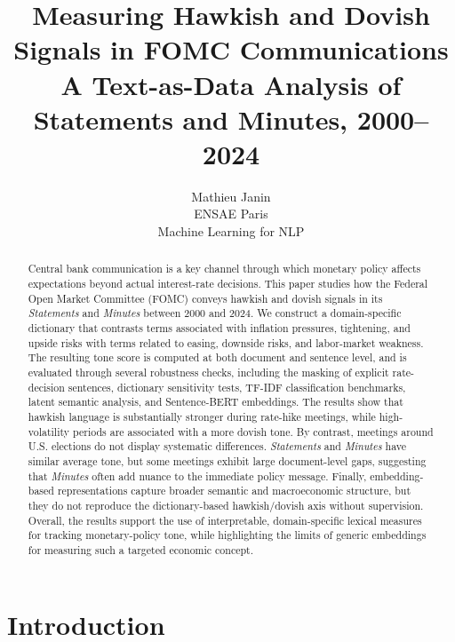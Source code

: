 \documentclass{article}
\title{Measuring Hawkish and Dovish Signals in FOMC Communications\\
{\large A Text-as-Data Analysis of Statements and Minutes, 2000--2024}}
\author{Mathieu Janin\\
ENSAE Paris\\
Machine Learning for NLP}
\begin{document}
\maketitle

\begin{abstract}

Central bank communication is a key channel through which monetary policy affects expectations beyond actual interest-rate decisions. This paper studies how the Federal Open Market Committee (FOMC) 
conveys hawkish and dovish signals in its \textit{Statements} and \textit{Minutes} between 2000 and 2024. We construct a domain-specific dictionary that contrasts terms associated with inflation pressures, 
tightening, and upside risks with terms related to easing, downside risks, and labor-market weakness. The resulting tone score is computed at both document and sentence level, and is evaluated through 
several robustness checks, including the masking of explicit rate-decision sentences, dictionary sensitivity tests, TF-IDF classification benchmarks, latent semantic analysis, and Sentence-BERT embeddings.
The results show that hawkish language is substantially stronger during rate-hike meetings, while high-volatility periods are associated with a more dovish tone. By contrast, meetings around U.S. elections 
do not display systematic differences. \textit{Statements} and \textit{Minutes} have similar average tone, but some meetings exhibit large document-level gaps, suggesting that \textit{Minutes} often add 
nuance to the immediate policy message. Finally, embedding-based representations capture broader semantic and macroeconomic structure, but they do not reproduce the dictionary-based hawkish/dovish axis 
without supervision. Overall, the results support the use of interpretable, domain-specific lexical measures for tracking monetary-policy tone, while highlighting the limits of generic embeddings for 
measuring such a targeted economic concept.

\end{abstract}

\section{Introduction}
\end{document}
